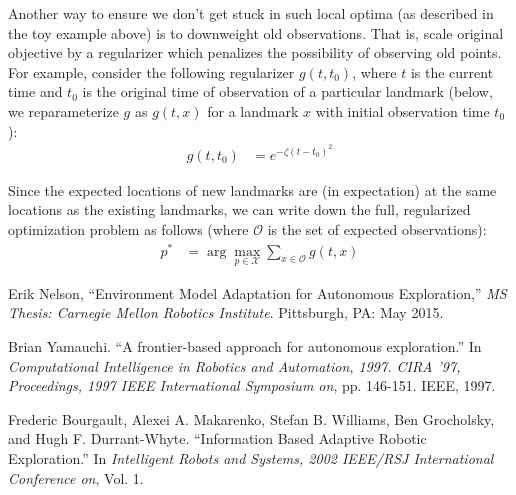 \documentclass[12pt]{article}
\begin{document}
Another way to ensure we don't get stuck in such local optima (as described in the toy example above) is to downweight old observations. That is, scale original objective by a regularizer which penalizes the possibility of observing old points. For example, consider the following regularizer $g(t, t_0)$, where $t$ is the current time and $t_0$ is the original time of observation of a particular landmark (below, we reparameterize $g$ as $g(t, x)$ for a landmark $x$ with initial observation time $t_0$):
\begin{align}
  g(t, t_0) &= e^{-\zeta (t - t_0)^2}
\end{align}

Since the expected locations of new landmarks are (in expectation) at the same locations as the existing landmarks, we can write down the full, regularized optimization problem as follows (where $\mathcal{O}$ is the set of expected observations):
\begin{align}
  p^* &= \arg \max_{p \in \mathcal{X}} \sum_{x \in \mathcal{O}} g(t, x)
\end{align}


\begin{thebibliography}{99}

 Erik Nelson, ``Environment Model Adaptation for Autonomous Exploration,'' \textit{MS Thesis: Carnegie Mellon Robotics Institute}. Pittsburgh, PA: May 2015.

 Brian Yamauchi. ``A frontier-based approach for autonomous exploration.'' In \textit{Computational Intelligence in Robotics and Automation, 1997. CIRA '97, Proceedings, 1997 IEEE International Symposium on}, pp. 146-151. IEEE, 1997.

 Frederic Bourgault, Alexei A. Makarenko, Stefan B. Williams, Ben Grocholsky, and Hugh F. Durrant-Whyte. ``Information Based Adaptive Robotic Exploration.'' In \textit{Intelligent Robots and Systems, 2002 IEEE/RSJ International Conference on}, Vol. 1.
  
\end{thebibliography}
\end{document}
